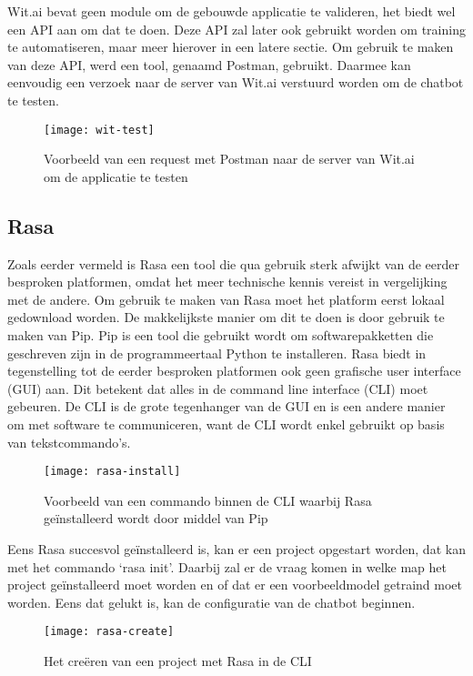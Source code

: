 Wit.ai bevat geen module om de gebouwde applicatie te valideren, het biedt wel een API aan om dat te doen. Deze API zal later ook gebruikt worden om training te automatiseren, maar meer hierover in een latere sectie. Om gebruik te maken van deze API, werd een tool, genaamd Postman, gebruikt. Daarmee kan eenvoudig een verzoek naar de server van Wit.ai verstuurd worden om de chatbot te testen.

\begin{figure}[H]
    \label{fig:wit-test}
    \centering
    \texttt{[image: wit-test]}
    \caption{Voorbeeld van een request met Postman naar de server van Wit.ai om de applicatie te testen}
\end{figure}

\subsection{Rasa}
\label{subsec:werking-platformen-rasa}

Zoals eerder vermeld is Rasa een tool die qua gebruik sterk afwijkt van de eerder besproken platformen, omdat het meer technische kennis vereist in vergelijking met de andere. Om gebruik te maken van Rasa moet het platform eerst lokaal gedownload worden. De makkelijkste manier om dit te doen is door gebruik te maken van Pip. Pip is een tool die gebruikt wordt om softwarepakketten die geschreven zijn in de programmeertaal Python te installeren. Rasa biedt in tegenstelling tot de eerder besproken platformen ook geen grafische user interface (GUI) aan. Dit betekent dat alles in de command line interface (CLI) moet gebeuren. De CLI is de grote tegenhanger van de GUI en is een andere manier om met software te communiceren, want de CLI wordt enkel gebruikt op basis van tekstcommando's.

\begin{figure}[H]
    \label{fig:rasa-install}
    \centering
    \texttt{[image: rasa-install]}
    \caption{Voorbeeld van een commando binnen de CLI waarbij Rasa geïnstalleerd wordt door middel van Pip}
\end{figure}

Eens Rasa succesvol geïnstalleerd is, kan er een project opgestart worden, dat kan met het commando ‘rasa init’. Daarbij zal er de vraag komen in welke map het project geïnstalleerd moet worden en of dat er een voorbeeldmodel getraind moet worden. Eens dat gelukt is, kan de configuratie van de chatbot beginnen.

\begin{figure}[H]
    \label{fig:rasa-create}
    \centering
    \texttt{[image: rasa-create]}
    \caption{Het creëren van een project met Rasa in de CLI}
\end{figure}

